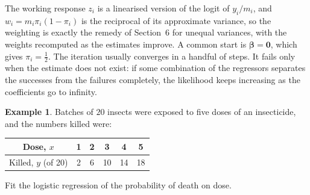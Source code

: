 \documentclass[11pt,a4paper]{article}
\numberwithin{equation}{section}
\theoremstyle{definition}
\newtheorem{exa}[thm]{Example}
\begin{document}
The working response $z_i$ is a linearised version of the logit of $y_i/m_i$, and $w_i = m_i\pi_i(1 - \pi_i)$ is the
reciprocal of its approximate variance, so the weighting is exactly the remedy of Section~6 for unequal
variances, with the weights recomputed as the estimates improve. A common start is $\boldsymbol\beta = \mathbf{0}$, which
gives $\pi_i = \frac12$. The iteration usually converges in a handful of steps. It fails only when the
estimate does not exist: if some combination of the regressors separates the successes from the failures
completely, the likelihood keeps increasing as the coefficients go to infinity.

\begin{exa}\label{exa:dose}
Batches of $20$ insects were exposed to five doses of an insecticide, and the numbers killed were:
\begin{center}
\begin{tabular}{c|ccccc}
Dose, $x$ & 1 & 2 & 3 & 4 & 5 \\
\hline
Killed, $y$ (of 20) & 2 & 6 & 10 & 14 & 18 \\
\end{tabular}
\end{center}
Fit the logistic regression of the probability of death on dose.
\end{exa}
\end{document}
